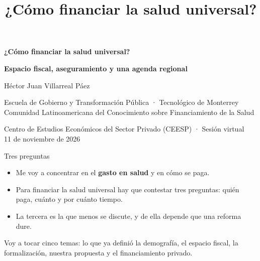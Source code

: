 \documentclass[aspectratio=169,10pt]{beamer}
\title{¿Cómo financiar la salud universal?}
\newcommand{\clave}[1]{{\color{marino}\bfseries #1}}
\begin{document}
\begin{frame}[plain]
  \centering
  \vspace*{1.2em}
  {\color{marino}\bfseries\Large ¿Cómo financiar la salud universal?\par}
  \vspace{0.35em}
  {\color{marino}\bfseries\normalsize Espacio fiscal, aseguramiento y una agenda regional\par}
  \vspace{2.2em}
  {\normalsize Héctor Juan Villarreal Páez\par}
  \vspace{1.1em}
  {\scriptsize Escuela de Gobierno y Transformación Pública · Tecnológico de Monterrey\\[0.3em]
  Comunidad Latinoamericana del Conocimiento sobre Financiamiento de la Salud\par}
  \vspace{1.6em}
  {\normalsize Centro de Estudios Económicos del Sector Privado (CEESP) · Sesión virtual\\[0.2em]
  11 de noviembre de 2026\par}
\end{frame}

\begin{frame}{Tres preguntas}
  \vspace{1.2em}
  \begin{itemize}\setlength{\itemsep}{0.35em}
    \item Me voy a concentrar en el \clave{gasto en salud} y en cómo se paga.
    \item Para financiar la salud universal hay que contestar tres preguntas: quién paga, cuánto y por cuánto tiempo.
    \item La tercera es la que menos se discute, y de ella depende que una reforma dure.
  \end{itemize}
  \vspace{0.6em}
  Voy a tocar cinco temas: lo que ya definió la demografía, el espacio fiscal, la formalización, nuestra propuesta y el financiamiento privado.
\end{frame}
\end{document}
